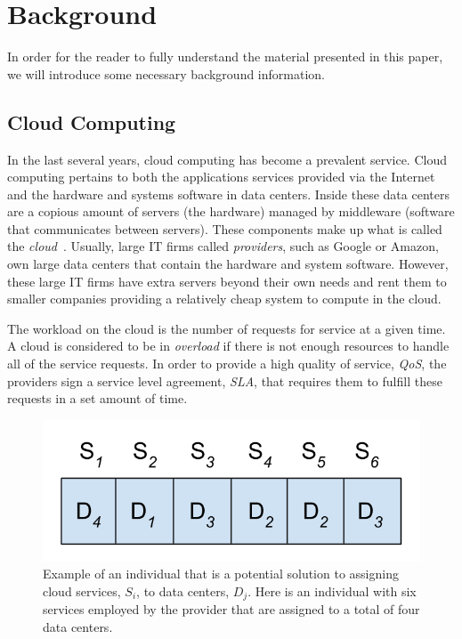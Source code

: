 \documentclass{sig-alternate}
\begin{document}
\section{Background} 
\label{Background}

In order for the reader to fully understand the material presented in this paper, we will introduce some necessary background information.

\subsection{Cloud Computing}
\label{sec:Cloud Computing}

In the last several years, cloud computing has become a prevalent service. Cloud computing pertains to both the applications services provided via the Internet and the hardware and systems software in data centers. Inside these data centers are a copious amount of servers (the hardware) managed by middleware (software that communicates between servers). These components make up what is called the \emph{cloud}~\cite{Armbrust}. Usually, large IT firms called \emph{providers}, such as Google or Amazon, own large data centers that contain the hardware and system software. However, these large IT firms have extra servers beyond their own needs and rent them to smaller companies providing a relatively cheap system to compute in the cloud. 

The workload on the cloud is the number of requests for service at a given time. A cloud is considered to be in \emph{overload} if there is not enough resources to handle all of the service requests. In order to provide a high quality of service, \emph{QoS}, the providers sign a service level agreement, \emph{SLA}, that requires them to fulfill these requests in a set amount of time. 

\begin{figure}[tb]
 \centering
 \includegraphics[height=0.15 \textwidth]{Individual}
 \caption{Example of an individual that is a potential solution to assigning cloud services, $S_i$, to data centers, $D_j$. Here is an individual with six services employed by the provider that are assigned to a total of four data centers.}
 \label{fig:EMOA}
\end{figure}
\end{document}
